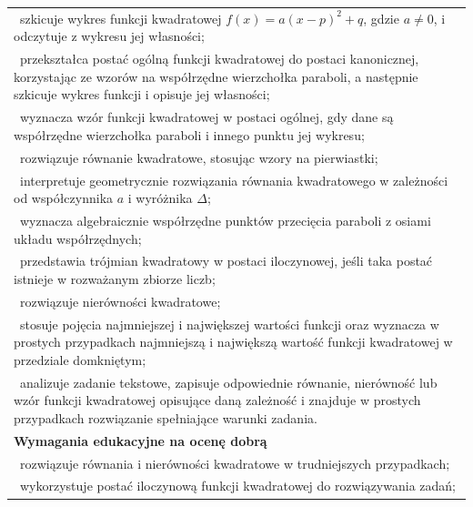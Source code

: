 \documentclass[12pt,a4paper]{article}
\begin{document}
\begin{longtable}{|p{16cm}|}
		\textbullet\ szkicuje wykres funkcji kwadratowej $f(x)=a(x-p)^2+q$, gdzie $a\neq 0$, i odczytuje z wykresu jej własności; \\
		
		\textbullet\ przekształca postać ogólną funkcji kwadratowej do postaci kanonicznej, korzystając ze wzorów na współrzędne wierzchołka paraboli, a następnie szkicuje wykres funkcji i opisuje jej własności; \\
		
		\textbullet\ wyznacza wzór funkcji kwadratowej w postaci ogólnej, gdy dane są współrzędne wierzchołka paraboli i innego punktu jej wykresu; \\
		
		\textbullet\ rozwiązuje równanie kwadratowe, stosując wzory na pierwiastki; \\
		
		\textbullet\ interpretuje geometrycznie rozwiązania równania kwadratowego w zależności od współczynnika $a$ i wyróżnika $\Delta$; \\
		
		\textbullet\ wyznacza algebraicznie współrzędne punktów przecięcia paraboli z osiami układu współrzędnych; \\
		
		\textbullet\ przedstawia trójmian kwadratowy w postaci iloczynowej, jeśli taka postać istnieje w rozważanym zbiorze liczb; \\
		
		\textbullet\ rozwiązuje nierówności kwadratowe; \\
		
		\textbullet\ stosuje pojęcia najmniejszej i największej wartości funkcji oraz wyznacza w prostych przypadkach najmniejszą i największą wartość funkcji kwadratowej w przedziale domkniętym; \\
		
		\textbullet\ analizuje zadanie tekstowe, zapisuje odpowiednie równanie, nierówność lub wzór funkcji kwadratowej opisujące daną zależność i znajduje w prostych przypadkach rozwiązanie spełniające warunki zadania. \\ \hline
		
		\textbf{Wymagania edukacyjne na ocenę dobrą} \\ \hline
		
		\textbullet\ rozwiązuje równania i nierówności kwadratowe w trudniejszych przypadkach; \\
		
		\textbullet\ wykorzystuje postać iloczynową funkcji kwadratowej do rozwiązywania zadań; \\
		

\end{longtable}
\end{document}
